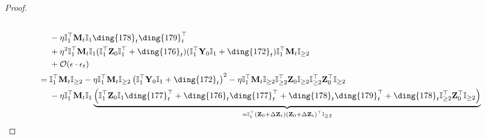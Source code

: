\documentclass{article}
\theoremstyle{plain}
\theoremstyle{remark}
\def\O{\mathcal{O}}
\def\bY{\mathbf{Y}}
\def\bZ{\mathbf{Z}}
\newcommand{\cc}[1]{\text{\ding{\number\numexpr#1 + 171\relax}}}
\begin{document}
\begin{proof}
\begin{align*}
        \\
        &~~~~
            - \eta\mathbb{I}_{1}^\top \mathbf{M}_{t} \mathbb{I}_{1}\cc{7}_t\cc{8}_t^\top 
        \\
        &~~~~
            + \eta^2 \mathbb{I}_{1}^\top\mathbf{M}_{t}\mathbb{I}_{1}
            (\mathbb{I}_{1}^\top\bZ_0\mathbb{I}_1^\top+\cc{5}_t)
            (\mathbb{I}_{1}^\top\bY_0\mathbb{I}_{1}+\cc{1}_t)\mathbb{I}_1^\top\mathbf{M}_{t}\mathbb{I}_{\ge 2}
        \\
        &~~~~
            +\O(\epsilon\cdot\epsilon_t)
        \\
        &=
            \mathbb{I}_{1}^\top\mathbf{M}_{t}\mathbb{I}_{\ge2}
            - \eta \mathbb{I}_{1}^\top\mathbf{M}_{t} \mathbb{I}_{\ge 2}  \left(\mathbb{I}_1^\top \bY_0 \mathbb{I}_1 + \cc{1}_t\right)^2
            - \eta\mathbb{I}_{1}^\top \mathbf{M}_{t} \mathbb{I}_{\ge 2}\mathbb{I}_{\ge 2}^\top \bZ_0 \mathbb{I}_{\ge 2}\mathbb{I}_{\ge2}^\top \bZ_0^\top\mathbb{I}_{\ge2} 
        \\
        &~~~~ 
            - \eta \mathbb{I}_{1}^\top\mathbf{M}_{t}\mathbb{I}_{1}\underbrace{\left(\mathbb{I}_{1}^\top\bZ_0\mathbb{I}_1\cc{6}_t^\top + \cc{5}_t\cc{6}_t^\top + \cc{7}_t\cc{8}_t^\top   +\cc{7}_t\mathbb{I}_{\ge2}^\top \bZ_0^\top\mathbb{I}_{\ge2} \right)}_{=\mathbb{I}_{1}^\top\left(\mathbf{Z}_0+\Delta\mathbf{Z}_{t}\right)\left(\mathbf{Z}_0+\Delta\mathbf{Z}_{t}\right)^\top\mathbb{I}_{\ge2}}

\end{align*}
\end{proof}
\end{document}
